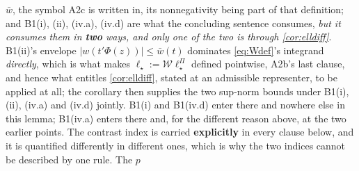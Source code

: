 \begin{lemma}
$\bar w$, the symbol A2c is written in, its nonnegativity being part of that definition; and B1(i), (ii),
(iv.a), (iv.d) are what the concluding sentence consumes, \emph{but it consumes them in \textbf{two} ways, and
only one of the two is through \cref{cor:elldiff}}. B1(ii)'s envelope $|w(t'\Phi(z))|\le\bar w(t)$
dominates
\eqref{eq:Wdef}'s integrand \emph{directly}, which is what makes $\ell_\star:=\mathcal W\ell^\Pi_\star$
defined pointwise, A2b's last clause, and hence what entitles \cref{cor:elldiff}, stated at an
admissible representer, to be applied at all; the corollary then supplies the two sup-norm bounds under
B1(i), (ii), (iv.a) and (iv.d) jointly. B1(i) and B1(iv.d) enter there and nowhere else in this lemma;
B1(iv.a) enters
there and, for the different reason above, at the two earlier points.
The contrast index is carried \textbf{explicitly} in every clause below, and it is quantified
differently in different ones, which is why the two indices cannot be described by one rule. The $p$

\end{lemma}
